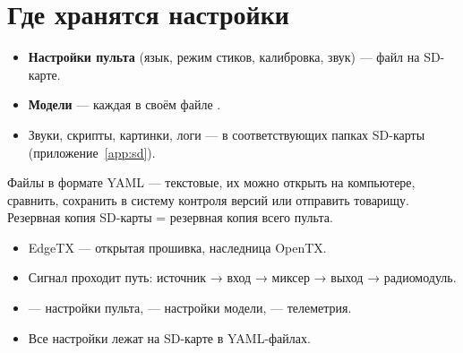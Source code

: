 \section{Где хранятся настройки}

\begin{itemize}
  \item \textbf{Настройки пульта} (язык, режим стиков, калибровка, звук) --- файл
         на SD-карте.
  \item \textbf{Модели} --- каждая в своём файле .
  \item Звуки, скрипты, картинки, логи --- в соответствующих папках SD-карты (приложение~\ref{app:sd}).
\end{itemize}

Файлы в формате YAML --- текстовые, их можно открыть на компьютере, сравнить, сохранить
в систему контроля версий или отправить товарищу. Резервная копия SD-карты = резервная копия
всего пульта.

\begin{summary}
\begin{itemize}
  \item EdgeTX --- открытая прошивка, наследница OpenTX.
  \item Сигнал проходит путь: источник → вход → миксер → выход → радиомодуль.
  \item {} --- настройки пульта,  --- настройки модели,  --- телеметрия.
  \item Все настройки лежат на SD-карте в YAML-файлах.
\end{itemize}
\end{summary}
